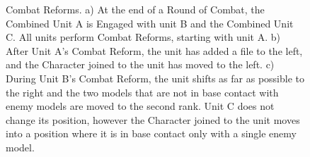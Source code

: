 \begin{figure}[!htbp]
	\centering
	\renewcommand{\figbiglettersize}{15}
	\def\svgwidth{0.85\textwidth}
	
	\caption{Combat Reforms.\captionpar
	a) At the end of a Round of Combat, the Combined Unit A is Engaged with unit B and the Combined Unit C. All units perform Combat Reforms, starting with unit A.\captionpar
	b) After Unit A's Combat Reform, the unit has added a file to the left, and the Character joined to the unit has moved to the left.\captionpar
	c) During Unit B's Combat Reform, the unit shifts as far as possible to the right and the two models that are not in base contact with enemy models are moved to the second rank. Unit C does not change its position, however the Character joined to the unit moves into a position where it is in base contact only with a single enemy model.%
	}
	\label{figure/combat_reforms}
\end{figure}
